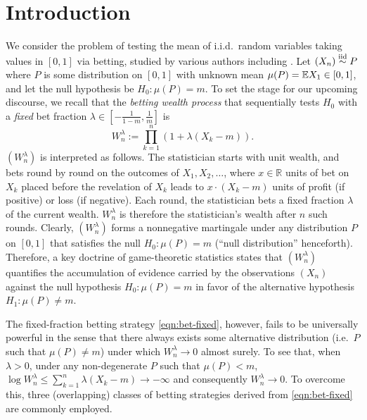 
\section{Introduction}\label{sec:intro}

We consider the problem of testing the mean of i.i.d.\ random variables taking values in $[0,1]$ via betting, studied by various authors including \cite{shafer2005probability,shafer2019game,shafer2021testing,waudby2024estimating,orabona2023tight,voracek2025starbets}. Let $(X_n) \overset{\mathrm{iid}}{\sim} P$ where $P$ is some distribution on $[0,1]$ with unknown mean $\mu(P) = \mathbb E X_1 \in [0,1]$, and let the null hypothesis be $H_0: \mu(P) = m$. To set the stage for our upcoming discourse, we recall that the \emph{betting wealth process} that sequentially tests $H_0$ with
a \emph{fixed} bet fraction $\lambda \in [-\frac{1}{1-m}, \frac{1}{m}]$ is
\begin{equation}\label{eqn:bet-fixed}
    W_n^\lambda := \prod_{k=1}^n (1 + \lambda(X_k - m) ).
\end{equation}
$(W_n^\lambda)$ is interpreted as follows. The statistician starts with unit wealth, and bets round by round on the outcomes of $X_1,X_2,\dots$, where $x \in \mathbb R$ units of bet on $X_k$ placed before the revelation of $X_k$ leads to $x\cdot (X_k - m)$ units of profit (if positive) or loss (if negative). Each round, the statistician bets a fixed fraction $\lambda$ of the current wealth.
$W_n^\lambda$ is therefore the statistician's wealth after $n$ such rounds. Clearly, $(W^\lambda_n)$ forms
a nonnegative martingale under any distribution $P$ on $[0,1]$ that satisfies the null $H_0: \mu(P)=m$ (``null distribution'' henceforth). Therefore, a key doctrine of game-theoretic statistics \citep{ramdas2023game} states that $(W^\lambda_n)$ quantifies the accumulation of evidence carried by the observations $(X_n)$ against the null hypothesis $H_0: \mu(P) = m$ in favor of the alternative hypothesis $H_1: \mu(P) \neq m$.




The fixed-fraction betting strategy \eqref{eqn:bet-fixed}, however, fails to be universally powerful in the sense that there always exists some alternative distribution (i.e.\ $P$ such that $\mu(P) \neq m$) under which $W_n^\lambda \to 0$ almost surely. To see that,  when $\lambda > 0$, under any non-degenerate $P$ such that $\mu(P) < m$, $\log W_n^\lambda \le \sum_{k=1}^n \lambda(X_k - m) \to -\infty$ and consequently $W_n^\lambda \to 0$. To overcome this, three (overlapping) classes of betting strategies derived from \eqref{eqn:bet-fixed} are 
commonly employed.


